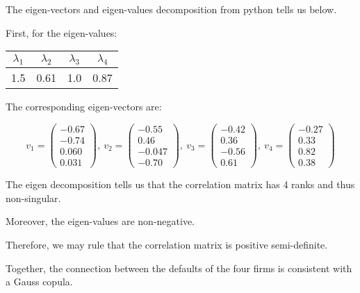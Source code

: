 \documentclass[11pt]{article}
\begin{document}
The eigen-vectors and eigen-values decomposition from python
tells us below.

First, for the eigen-values:

\begin{center}
\begin{tabular}{||c | c | c | c||} 
 \hline
 $\lambda_1$ & $\lambda_2$ & $\lambda_3$ & $\lambda_4$ \\
 \hline
 1.5 & 0.61 & 1.0 & 0.87 \\ 
 \hline
\end{tabular}
\end{center}

The corresponding eigen-vectors are:

$$
v_1 = \left( 
\begin{matrix}
-0.67 \\
-0.74 \\
0.060 \\
0.031
\end{matrix}
\right), \
v_2 = \left( 
\begin{matrix}
-0.55 \\
0.46 \\
-0.047 \\
-0.70
\end{matrix}
\right), \
v_3 = \left( 
\begin{matrix}
-0.42 \\
0.36 \\
-0.56 \\
0.61
\end{matrix}
\right), \
v_4 = \left( 
\begin{matrix}
-0.27 \\
0.33 \\
0.82 \\
0.38
\end{matrix}
\right)
$$

The eigen decomposition tells us that the correlation matrix
has 4 ranks and thus non-singular.

Moreover, the eigen-values are non-negative.

Therefore, we may rule that the correlation matrix is positive
semi-definite.

Together, the connection between the defaults of the four firms
is consistent with a Gauss copula.
\end{document}
